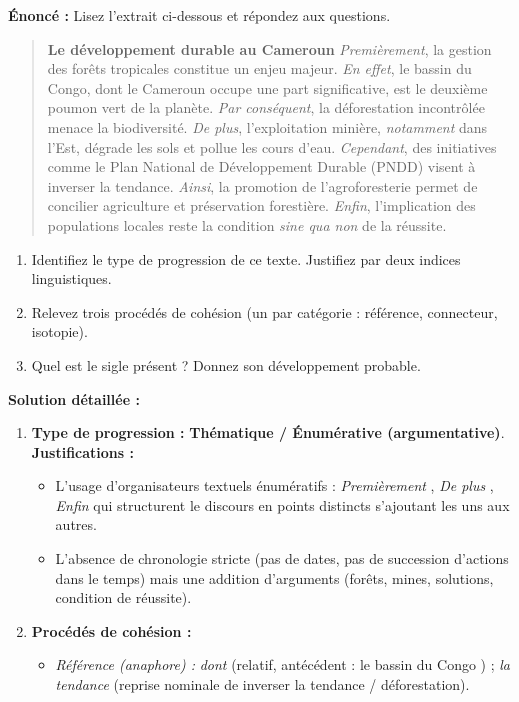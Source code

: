 \documentclass[11pt]{article}
\begin{document}
\begin{exoresolu}
\textbf{Énoncé :} Lisez l'extrait ci-dessous et répondez aux questions.
\begin{quote}
\textbf{Le développement durable au Cameroun}
\emph{Premièrement}, la gestion des forêts tropicales constitue un enjeu majeur. \emph{En effet}, le bassin du Congo, dont le Cameroun occupe une part significative, est le deuxième poumon vert de la planète. \emph{Par conséquent}, la déforestation incontrôlée menace la biodiversité. \emph{De plus}, l'exploitation minière, \emph{notamment} dans l'Est, dégrade les sols et pollue les cours d'eau. \emph{Cependant}, des initiatives comme le Plan National de Développement Durable (PNDD) visent à inverser la tendance. \emph{Ainsi}, la promotion de l'agroforesterie permet de concilier agriculture et préservation forestière. \emph{Enfin}, l'implication des populations locales reste la condition \emph{sine qua non} de la réussite.
\end{quote}
\begin{enumerate}
    \item Identifiez le type de progression de ce texte. Justifiez par deux indices linguistiques.
    \item Relevez trois procédés de cohésion (un par catégorie : référence, connecteur, isotopie).
    \item Quel est le sigle présent ? Donnez son développement probable.
\end{enumerate}
\tcblower
\textbf{Solution détaillée :}
\begin{enumerate}
    \item \textbf{Type de progression :} \textbf{Thématique / Énumérative (argumentative)}. 
    \textbf{Justifications :}
    \begin{itemize}
        \item L'usage d'organisateurs textuels énumératifs : \og \emph{Premièrement} \fg{}, \og \emph{De plus} \fg{}, \og \emph{Enfin} \fg{} qui structurent le discours en points distincts s'ajoutant les uns aux autres.
        \item L'absence de chronologie stricte (pas de dates, pas de succession d'actions dans le temps) mais une addition d'arguments (forêts, mines, solutions, condition de réussite).
    \end{itemize}
    \item \textbf{Procédés de cohésion :}
    \begin{itemize}
        \item \emph{Référence (anaphore) :} \og \emph{dont} \fg{} (relatif, antécédent : \og le bassin du Congo \fg{}) ; \og \emph{la tendance} \fg{} (reprise nominale de \og inverser la tendance \fg{} / déforestation).

\end{itemize}
\end{enumerate}
\end{exoresolu}
\end{document}
